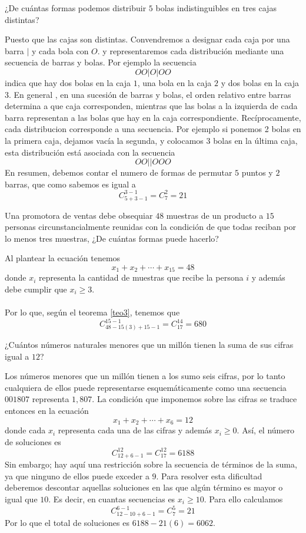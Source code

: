\documentclass[12pt]{article}
\begin{document}
\begin{ejemplo}
¿De cuántas formas podemos distribuir $5$ bolas indistinguibles en tres cajas distintas?
\end{ejemplo}
\begin{solucion}
Puesto que las cajas son distintas. Convendremos a designar cada caja por una barra $|$ y cada bola con $O$. y representaremos cada distribución mediante una secuencia de barras y bolas. Por ejemplo la secuencia
\[OO|O|OO\]
indica  que  hay  dos  bolas  en  la  caja  $1$,  una  bola  en  la  caja  $2$ y dos  bolas  en  la  caja  $3$. En  general  ,  en  una  sucesión  de  barras y  bolas,  el  orden  relativo  entre  barras  determina  a  que  caja  corresponden,  mientras  que  las bolas  a  la  izquierda  de  cada barra  representan  a  las  bolas  que  hay  en  la  caja  correspondiente. Recíprocamente, cada distribucion corresponde a una secuencia.  Por ejemplo  si  ponemos  2  bolas  en  la  primera  caja,  dejamos  vacía  la segunda,  y  colocamos  3  bolas  en  la  última  caja,  esta  distribución está asociada con la secuencia
\[OO||OOO\]
En resumen, debemos contar el numero de formas de permutar $5$ puntos y $2$ barras, que como sabemos es igual a
\[C^{3-1}_{5+3-1}=C^{2}_7=21\]
\end{solucion}
\begin{ejemplo}
Una promotora de ventas debe obsequiar $48$ muestras de un producto a $15$ personas circunstancialmente reunidas con la condición de que todas reciban por lo menos tres muestras, ¿De cuántas formas puede hacerlo?
\end{ejemplo}
\begin{solucion}
Al plantear la ecuación tenemos
\[x_1+x_2+\cdots+x_{15}=48\]
donde $x_i$ representa la cantidad de muestras que recibe la persona $i$ y además debe cumplir que $x_i\geq 3$.\\\\
Por lo que, según el teorema \ref{teo3}, tenemos que 
\[C^{15-1}_{48-15(3)+15-1}=C^{14}_{17}=680\]
\end{solucion}
\begin{ejemplo}
 ¿Cuántos números naturales menores que un millón tienen la suma de sus cifras igual a $12$?   
\end{ejemplo}
\begin{solucion}
Los números menores que un millón tienen a los sumo seis cifras, por lo  tanto  cualquiera  de  ellos  puede  representarse  esquemáticamente como  una  secuencia  $001807$  representa  $1,807$. La  condición  que imponemos sobre las cifras se traduce entonces en la ecuación
\[x_1+x_2+\cdots+x_6=12\]
donde cada $x_i$ representa cada una de las cifras y además $x_i\geq 0$. Así, el número de soluciones es
\[C^{12}_{12+6-1}=C^{12}_{17}=6188\]
Sin  embargo;  hay  aquí  una  restricción  sobre  la  secuencia  de  términos  de  la  suma,  ya  que  ninguno  de  ellos  puede  exceder  a  $9$.   Para resolver  esta  dificultad  deberemos  descontar  aquellas  soluciones  en las que algún término es mayor o igual que $10$.  Es decir, en cuantas secuencias es $x_i\geq 10$. Para ello calculamos
\[C^{6-1}_{12-10+6-1}=C^5_7=21\]
Por lo que el total de soluciones es $6188-21(6)=6062$.
\end{solucion}
\end{document}
